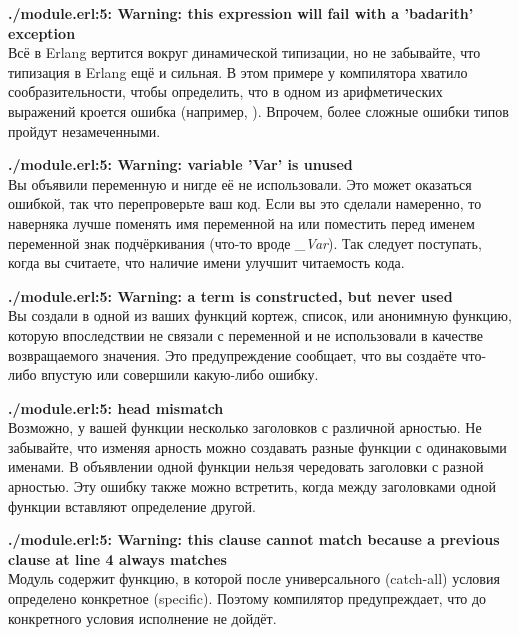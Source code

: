 \blankline
\begin{minipage}{\textwidth}
\textbf{./module.erl:5: Warning: this expression will fail with a 'badarith' exception}\\
Всё в Erlang вертится вокруг динамической типизации, но не забывайте, что типизация в Erlang ещё и сильная.
В этом примере у компилятора хватило сообразительности, чтобы определить, что в одном из арифметических выражений кроется ошибка (например, ).
Впрочем, более сложные ошибки типов пройдут незамеченными.
\end{minipage}

\blankline
\begin{minipage}{\textwidth}
    \textbf{./module.erl:5: Warning: variable 'Var' is unused}\\
    Вы объявили переменную и нигде её не использовали.
    Это может оказаться ошибкой, так что перепроверьте ваш код.
    Если вы это сделали намеренно, то наверняка лучше поменять имя переменной на \ops{\strut{\_}} или поместить перед именем переменной знак подчёркивания (что\--то вроде \emph{\_Var}).
    Так следует поступать, когда вы считаете, что наличие имени улучшит читаемость кода.
\end{minipage}

\blankline
\begin{minipage}{\textwidth}
    \textbf{./module.erl:5: Warning: a term is constructed, but never used}\\
    Вы создали в одной из ваших функций кортеж, список, или анонимную функцию, которую впоследствии не связали с переменной и не использовали в качестве возвращаемого значения.
    Это предупреждение сообщает, что вы создаёте что\--либо впустую или совершили какую\--либо ошибку.
\end{minipage}

\blankline
\begin{minipage}{\textwidth}
    \textbf{./module.erl:5: head mismatch}\\
    Возможно, у вашей функции несколько заголовков с различной арностью.
    Не забывайте, что изменяя арность можно создавать разные функции с одинаковыми именами.
    В объявлении одной функции нельзя чередовать заголовки с разной арностью.
    Эту ошибку также можно встретить, когда между заголовками одной функции вставляют определение другой.
\end{minipage}

\blankline
\begin{minipage}{\textwidth}
    \textbf{./module.erl:5: Warning: this clause cannot match because a previous clause at line 4 always matches}\\
    Модуль содержит функцию, в которой после универсального (catch-all) условия определено конкретное (specific).
    Поэтому компилятор предупреждает, что до конкретного условия исполнение не дойдёт.
\end{minipage}

